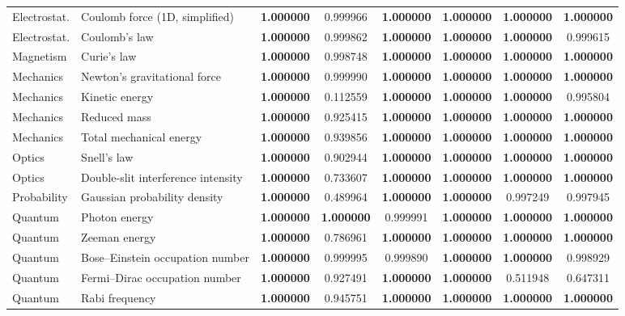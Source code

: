 \documentclass[twoside,11pt]{article}
\begin{document}
{\begin{longtable}{p{1.9cm}p{4.3cm}cccccc}
Electrostat. & Coulomb force (1D, simplified) & \textbf{1.000000} & 0.999966 & \textbf{1.000000} & \textbf{1.000000} & \textbf{1.000000} & \textbf{1.000000} \\
Electrostat. & Coulomb's law & \textbf{1.000000} & 0.999862 & \textbf{1.000000} & \textbf{1.000000} & \textbf{1.000000} & 0.999615 \\
Magnetism & Curie's law & \textbf{1.000000} & 0.998748 & \textbf{1.000000} & \textbf{1.000000} & \textbf{1.000000} & \textbf{1.000000} \\
Mechanics & Newton's gravitational force & \textbf{1.000000} & 0.999990 & \textbf{1.000000} & \textbf{1.000000} & \textbf{1.000000} & \textbf{1.000000} \\
Mechanics & Kinetic energy & \textbf{1.000000} & 0.112559 & \textbf{1.000000} & \textbf{1.000000} & \textbf{1.000000} & 0.995804 \\
Mechanics & Reduced mass & \textbf{1.000000} & 0.925415 & \textbf{1.000000} & \textbf{1.000000} & \textbf{1.000000} & \textbf{1.000000} \\
Mechanics & Total mechanical energy & \textbf{1.000000} & 0.939856 & \textbf{1.000000} & \textbf{1.000000} & \textbf{1.000000} & \textbf{1.000000} \\
Optics & Snell's law & \textbf{1.000000} & 0.902944 & \textbf{1.000000} & \textbf{1.000000} & \textbf{1.000000} & \textbf{1.000000} \\
Optics & Double-slit interference intensity & \textbf{1.000000} & 0.733607 & \textbf{1.000000} & \textbf{1.000000} & \textbf{1.000000} & \textbf{1.000000} \\
Probability & Gaussian probability density & \textbf{1.000000} & 0.489964 & \textbf{1.000000} & \textbf{1.000000} & 0.997249 & 0.997945 \\
Quantum & Photon energy & \textbf{1.000000} & \textbf{1.000000} & 0.999991 & \textbf{1.000000} & \textbf{1.000000} & \textbf{1.000000} \\
Quantum & Zeeman energy & \textbf{1.000000} & 0.786961 & \textbf{1.000000} & \textbf{1.000000} & \textbf{1.000000} & \textbf{1.000000} \\
Quantum & Bose--Einstein occupation number & \textbf{1.000000} & 0.999995 & 0.999890 & \textbf{1.000000} & \textbf{1.000000} & 0.998929 \\
Quantum & Fermi--Dirac occupation number & \textbf{1.000000} & 0.927491 & \textbf{1.000000} & \textbf{1.000000} & 0.511948 & 0.647311 \\
Quantum & Rabi frequency & \textbf{1.000000} & 0.945751 & \textbf{1.000000} & \textbf{1.000000} & \textbf{1.000000} & \textbf{1.000000} \\

\end{longtable}}
\end{document}
